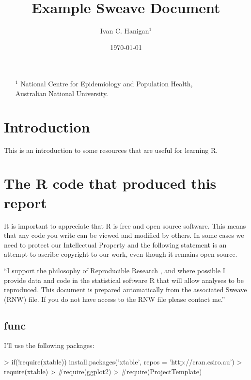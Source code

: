 \documentclass[a4paper]{article}
\begin{document}

%
\title{Example Sweave Document}
\author{Ivan C. Hanigan$^{1}$}
\date {\today}
\maketitle
\begin{itemize}
\item [$^1$] National Centre for Epidemiology and Population Health, \\Australian National University.
\end{itemize}

\setcounter{page}{1}
\tableofcontents 
\listoftables
\listoffigures
{}
\setcounter{page}{1}

\section{Introduction}
This is an introduction to some resources that are useful for learning R.  
\section{The R code that produced this report}
It is important to appreciate that R is free and open source software.  This means that any code you write can be viewed and modified by others.  In some cases we need to protect our Intellectual Property and the following statement is an attempt to ascribe copyright to our work, even though it remains open source.

``I support the philosophy of Reproducible Research \cite{Peng2011}, and where possible I provide data and code in the statistical software R that will allow analyses to be reproduced.  This document is prepared automatically from the associated Sweave (RNW) file.  If you do not have access to the RNW file please contact me.''


\subsection{func}
I'll use the following packages:
\begin{Schunk}
\begin{Sinput}
> if(!require(xtable)) install.packages('xtable', repos = 'http://cran.csiro.au')
> require(xtable)
> #require(ggplot2)
> #require(ProjectTemplate)
\end{Sinput}
\end{Schunk}
\end{document}
